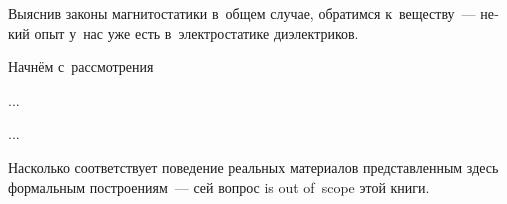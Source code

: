 
\begin{otherlanguage}{russian}

Выяснив законы магнитостатики в~общем случае, обратимся к~веществу~--- некий опыт у~нас уже есть в~электростатике ди\-элект\-ри\-ков.

Начнём с~рассмотрения

...



...

Насколько соответствует поведение реальных материалов представленным здесь формальным построениям~--- сей вопрос is out of~scope этой книги.

\end{otherlanguage}



